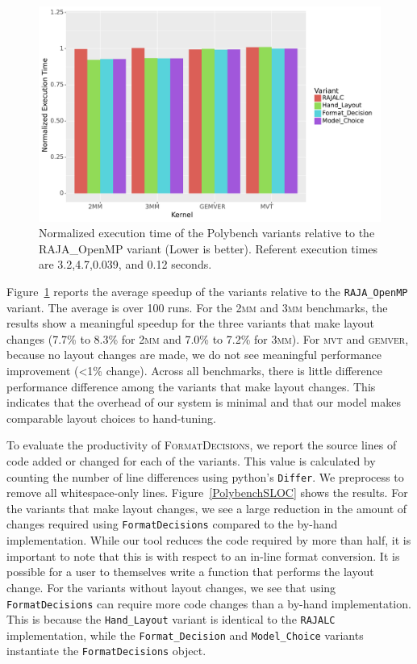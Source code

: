 \documentclass[sigconf,review=true]{acmart}
\begin{document}
\begin{figure}
	\includegraphics[width=\columnwidth]{PolybenchPerfPlot.pdf}
	\caption{Normalized execution time of the Polybench variants relative to the RAJA\_OpenMP variant (Lower is better). Referent execution times are 3.2,4.7,0.039, and 0.12 seconds.}
	\label{PolybenchPerformance}
\end{figure}

Figure~\ref{PolybenchPerformance} reports the average speedup of the variants relative to the \verb.RAJA_OpenMP. variant. 
The average is over 100 runs. 
For the \textsc{2mm} and \textsc{3mm} benchmarks, the results show a meaningful speedup for the three variants that make layout changes (7.7\% to 8.3\% for \textsc{2mm} and 7.0\% to 7.2\% for \textsc{3mm}).
For \textsc{mvt} and \textsc{gemver}, because no layout changes are made, we do not see meaningful performance improvement (<1\% change).
Across all benchmarks, there is little difference performance difference among the variants that make layout changes.
This indicates that the overhead of our system is minimal and that our model makes comparable layout choices to hand-tuning.

To evaluate the productivity of \textsc{FormatDecisions}, we report the source lines of code added or changed for each of the variants.
This value is calculated by counting the number of line differences using python's \verb.Differ.. 
We preprocess to remove all whitespace-only lines.
Figure~\ref{PolybenchSLOC} shows the results.
For the variants that make layout changes, we see a large reduction in the amount of changes required using \verb.FormatDecisions. compared to the by-hand implementation. 
While our tool reduces the code required by more than half, it is important to note that this is with respect to an in-line format conversion.
It is possible for a user to themselves write a function that performs the layout change.
For the variants without layout changes, we see that using \verb.FormatDecisions. can require more code changes than a by-hand implementation. 
This is because the \verb.Hand_Layout. variant is identical to the \verb.RAJALC. implementation, while the \verb.Format_Decision. and \verb.Model_Choice. variants instantiate the \verb.FormatDecisions. object.
\end{document}
